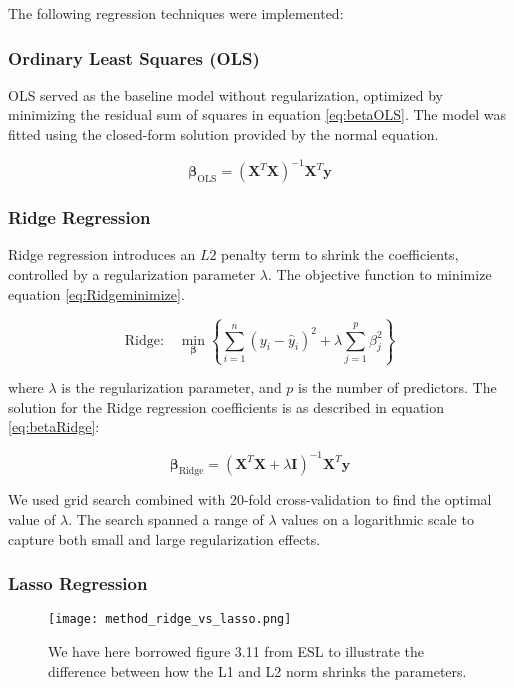 The following regression techniques were implemented:

\subsubsection{Ordinary Least Squares (OLS)}

OLS served as the baseline model without regularization, optimized by minimizing the residual sum of squares in equation \ref{eq:betaOLS}. The model was fitted using the closed-form solution provided by the normal equation.

\begin{equation}
    \boldsymbol{\beta}_{\text{OLS}} = (\mathbf{X}^T \mathbf{X})^{-1} \mathbf{X}^T \mathbf{y}
    \label{eq:betaOLS}
\end{equation}

\subsubsection{Ridge Regression}

Ridge regression introduces an $L2$ penalty term to shrink the coefficients, controlled by a regularization parameter $\lambda$. The objective function to minimize equation \ref{eq:Ridgeminimize}.

\begin{equation}
       \text{Ridge:} \quad \min_{\boldsymbol{\beta}} \left\{ \sum_{i=1}^{n} (y_i - \hat{y}_i)^2 + \lambda \sum_{j=1}^{p} \beta_j^2 \right\}
    \label{eq:Ridgeminimize}
\end{equation}

where $\lambda$ is the regularization parameter, and $p$ is the number of predictors. The solution for the Ridge regression coefficients is as described in equation \ref{eq:betaRidge}:

\begin{equation}
    \boldsymbol{\beta}_{\text{Ridge}} = (\mathbf{X}^T \mathbf{X} + \lambda \mathbf{I})^{-1} \mathbf{X}^T \mathbf{y}
    \label{eq:betaRidge}
\end{equation}

We used grid search combined with 20-fold cross-validation to find the optimal value of $\lambda$. The search spanned a range of $\lambda$ values on a logarithmic scale to capture both small and large regularization effects.

\subsubsection{Lasso Regression}
\begin{figure}[h]
\texttt{[image: method\_ridge\_vs\_lasso.png]}
\caption{We have here borrowed figure 3.11 from ESL to illustrate the difference between how the L1 and L2 norm shrinks the parameters. \cite{ESL}}
\label{fig:L1vsL2}
\end{figure}

